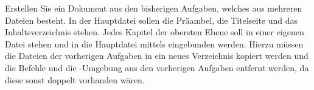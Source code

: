 	Erstellen Sie ein Dokument aus den bisherigen Aufgaben, welches aus mehreren Dateien besteht. In der Hauptdatei sollen die Präambel, die Titelseite und das Inhaltsverzeichnis stehen. Jedes Kapitel der obersten Ebene soll in einer eigenen Datei stehen und in die Hauptdatei mittels  eingebunden werden. Hierzu müssen die Dateien der vorherigen Aufgaben in ein neues Verzeichnis kopiert werden und die Befehle  und die -Umgebung aus den vorherigen Aufgaben entfernt werden, da diese sonst doppelt vorhanden wären.
		 
